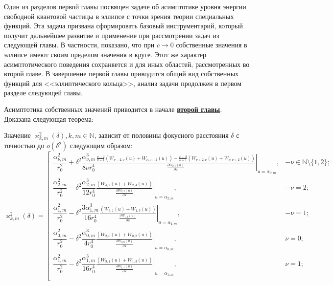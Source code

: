 Один из разделов первой главы посвящен задаче об асимптотике уровня энергии свободной квантовой частицы в эллипсе с точки зрения теории специальных функций. Эта задача призвана сформировать базовый инструментарий, который получит дальнейшее развитие и применение при рассмотрении задач из следующей главы. В частности, показано, что при $c\to0$ собственные значения в эллипсе имеют своим пределом значения в круге. Этот же характер асимптотического поведения сохраняется и для иных областей, рассмотренных во второй главе.
В завершение первой главы приводится общий вид собственных функций для <<эллиптического кольца>>, анализ задачи продолжен в первом разделе следующей главы.

Асимптотика собственных значений приводится в начале \underline{\textbf{второй главы}}. 
Доказана следующая теорема:
\begin{theorem}
	Значение $\varkappa^2_{k,m}(\delta), k, m \in \mathbb{N}$, зависит от половины фокусного расстояния $\delta$ с точностью до $o(\delta^2)$ следующим образом:
{\small
\begin{equation}
\varkappa^2_{k,m}(\delta) = \left[
\begin{array}{cc}
\dfrac{\alpha_{\nu, m}^2}{r_0^2} + \delta^2 \dfrac{\alpha_{\nu, m}^3}{8 \nu r_0^4} \left. \frac{
\frac{\nu-2}{\nu-1}
\left(
W_{\nu-2, \nu}(u) + W_{\nu, \nu-2}(u)
\right)- 
\frac{\nu+2}{\nu+1}
\left(
W_{\nu+2, \nu}(u) + W_{\nu, \nu+2}(u)
\right)
}{ \frac{\partial W_{\nu,\nu}(u)}{\partial u} }\right|_{u=\alpha_{\nu, m}},  & -\nu \in \mathbb{N} \setminus \{1, 2\}; \\

\dfrac{\alpha_{2, m}^2}{r_0^2} - \delta^2 \dfrac{\alpha_{2, m}^3}{12  r_0^4} \left. \frac{
	\left(
	W_{4, 2}(u) + W_{2, 4}(u)
	\right)
}{ \frac{\partial W_{2,2}(u)}{\partial u} }\right|_{u=\alpha_{2, m}}, & -\nu=2; \\

\dfrac{\alpha_{1, m}^2}{r_0^2} - \delta^2 \dfrac{3 \alpha_{1, m}^3 }{16 r_0^4}
\left. \frac{
	\left(
	W_{3, 1}(u) + W_{1, 3}(u)
	\right)
}{ \frac{\partial W_{1,1}(u)}{\partial u} }\right|_{u=\alpha_{1, m}}, & -\nu=1; \\


\dfrac{\alpha_{0, m}^2}{r_0^2} - \delta^2 \dfrac{\alpha_{0, m}^3}{4r_0^4} \left. \frac{
 \left( W_{2, 0}(u) + W_{0, 2}(u) \right)
}{ \frac{\partial W_{0,0}(u)}{\partial u} }\right|_{u=\alpha_{0, m}}, & \nu=0;   \\

\dfrac{\alpha_{1, m}^2}{r_0^2} - \delta^2 \dfrac{\alpha_{1, m}^3}{16 r_0^4} \left. \frac{ \left( W_{3, 1}(u) + W_{1, 3}(u) \right)
}{ \frac{\partial W_{1,1}(u)}{\partial u} }\right|_{u=\alpha_{1, m}},    & \nu=1;\\


\end{array}
\end{equation}}
\end{theorem}

